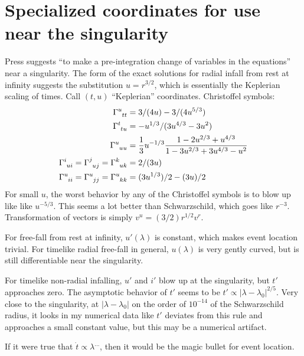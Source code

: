 \documentclass{article}
\begin{document}
\section{Specialized coordinates for use near the singularity}

Press suggests ``to make
a pre-integration change of variables in the equations'' near a singularity.
The form of the exact solutions for radial infall from rest at infinity suggests
the substitution $u=r^{3/2}$, which is essentially the Keplerian scaling of times.
Call $(t,u)$ ``Keplerian'' coordinates. Christoffel symbols:
\begin{align*}
\Gamma\indices{^u_t_t} &= 3/(4u)-3/(4u^{5/3})  \\
\Gamma\indices{^t_t_u} &= -u^{1/3}/(3u^{4/3}-3u^2)  \\
\Gamma\indices{^u_u_u} &= \frac{1}{3}u^{-1/3}\frac{1-2u^{2/3}+u^{4/3}}{1-3u^{2/3}+3u^{4/3}-u^2} \\
\Gamma\indices{^i_u_i} = \Gamma\indices{^j_u_j} = \Gamma\indices{^k_u_k} &= 2/(3u)  \\
\Gamma\indices{^u_i_i} = \Gamma\indices{^u_j_j} = \Gamma\indices{^u_k_k} &= (3u^{1/3})/2-(3u)/2  
\end{align*}
For small $u$, the worst behavior by any of the Christoffel symbols is
to blow up like like $u^{-5/3}$. This seems a lot better than
Schwarzschild, which goes like $r^{-3}$. Transformation of vectors is simply
$v^u=(3/2)r^{1/2}v^r$.

For free-fall from rest at infinity, $u'(\lambda)$ is
constant, which makes event location trivial. For timelike radial free-fall in general,
$u(\lambda)$ is very gently curved, but is still differentiable near the singularity.

For timelike non-radial infalling, $u'$ and $i'$ blow up at the singularity, but
$t'$ approaches zero. The asymptotic behavior of $t'$ seems to be
$t'\propto|\lambda-\lambda_0|^{2/5}$. Very close to the singularity,
at $|\lambda-\lambda_0|$ on the order of $10^{-14}$ of the Schwarzschild radius,
it looks in my numerical data like $t'$ deviates from this rule and approaches
a small constant value, but this may be a numerical artifact.

If it were true that $\dot{t}\propto \lambda^{\ldots}$, then it would be the magic bullet for
event location.
\end{document}
